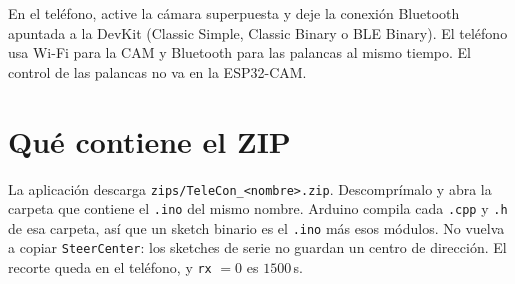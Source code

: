 \documentclass[12pt,a4paper]{article}
\begin{document}
En el teléfono, active la cámara superpuesta y deje la conexión Bluetooth
apuntada a la DevKit (Classic Simple, Classic Binary o BLE Binary). El
teléfono usa Wi-Fi para la CAM y Bluetooth para las palancas al mismo
tiempo. El control de las palancas no va en la ESP32-CAM.

\section{Qué contiene el ZIP}

La aplicación descarga \texttt{zips/TeleCon\_<nombre>.zip}. Descomprímalo
y abra la carpeta que contiene el \texttt{.ino} del mismo nombre. Arduino
compila cada \texttt{.cpp} y \texttt{.h} de esa carpeta, así que un sketch
binario es el \texttt{.ino} más esos módulos. No vuelva a copiar
\texttt{SteerCenter}: los sketches de serie no guardan un centro de
dirección. El recorte queda en el teléfono, y \texttt{rx} $= 0$ es
$1500$\,\textmu s.
\end{document}
